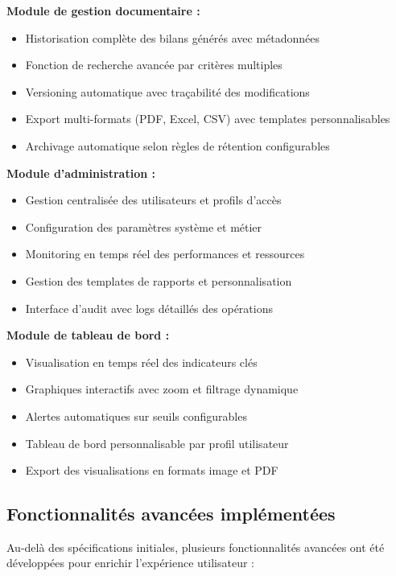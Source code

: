 \textbf{Module de gestion documentaire :}
\begin{itemize}
    \item Historisation complète des bilans générés avec métadonnées
    \item Fonction de recherche avancée par critères multiples
    \item Versioning automatique avec traçabilité des modifications
    \item Export multi-formats (PDF, Excel, CSV) avec templates personnalisables
    \item Archivage automatique selon règles de rétention configurables
\end{itemize}

\textbf{Module d'administration :}
\begin{itemize}
    \item Gestion centralisée des utilisateurs et profils d'accès
    \item Configuration des paramètres système et métier
    \item Monitoring en temps réel des performances et ressources
    \item Gestion des templates de rapports et personnalisation
    \item Interface d'audit avec logs détaillés des opérations
\end{itemize}

\textbf{Module de tableau de bord :}
\begin{itemize}
    \item Visualisation en temps réel des indicateurs clés
    \item Graphiques interactifs avec zoom et filtrage dynamique
    \item Alertes automatiques sur seuils configurables
    \item Tableau de bord personnalisable par profil utilisateur
    \item Export des visualisations en formats image et PDF
\end{itemize}

\subsection{Fonctionnalités avancées implémentées}

Au-delà des spécifications initiales, plusieurs fonctionnalités avancées ont été développées pour enrichir l'expérience utilisateur :

\medskip

